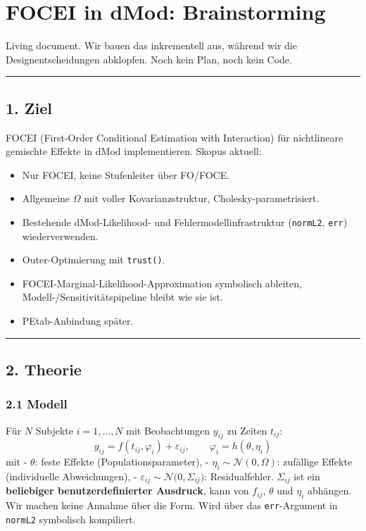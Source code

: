 \documentclass[
]{article}
\author{}
\date{\vspace{-2.5em}}
\providecommand{\tightlist}{%
  \setlength{\itemsep}{0pt}\setlength{\parskip}{0pt}}
\begin{document}
\section{FOCEI in dMod:
Brainstorming}\label{focei-in-dmod-brainstorming}

Living document. Wir bauen das inkrementell aus, während wir die
Designentscheidungen abklopfen. Noch kein Plan, noch kein Code.

\begin{center}\rule{0.5\linewidth}{0.5pt}\end{center}

\subsection{1. Ziel}\label{ziel}

FOCEI (First-Order Conditional Estimation with Interaction) für
nichtlineare gemischte Effekte in dMod implementieren. Skopus aktuell:

\begin{itemize}
\tightlist
\item
  Nur FOCEI, keine Stufenleiter über FO/FOCE.
\item
  Allgemeine \(\Omega\) mit voller Kovarianzstruktur,
  Cholesky-parametrisiert.
\item
  Bestehende dMod-Likelihood- und Fehlermodellinfrastruktur
  (\texttt{normL2}, \texttt{err}) wiederverwenden.
\item
  Outer-Optimierung mit \texttt{trust()}.
\item
  FOCEI-Marginal-Likelihood-Approximation symbolisch ableiten,
  Modell-/Sensitivitätspipeline bleibt wie sie ist.
\item
  PEtab-Anbindung später.
\end{itemize}

\begin{center}\rule{0.5\linewidth}{0.5pt}\end{center}

\subsection{2. Theorie}\label{theorie}

\subsubsection{2.1 Modell}\label{modell}

Für \(N\) Subjekte \(i = 1, \dots, N\) mit Beobachtungen \(y_{ij}\) zu
Zeiten \(t_{ij}\): \[
y_{ij} = f(t_{ij}, \varphi_i) + \varepsilon_{ij}, \qquad \varphi_i = h(\theta, \eta_i)
\] mit - \(\theta\): feste Effekte (Populationsparameter), -
\(\eta_i \sim \mathcal{N}(0, \Omega)\): zufällige Effekte (individuelle
Abweichungen), -
\(\varepsilon_{ij} \sim \mathcal{N}\!\bigl(0, \Sigma_{ij}\bigr)\):
Residualfehler. \(\Sigma_{ij}\) ist ein \textbf{beliebiger
benutzerdefinierter Ausdruck}, kann von \(f_{ij}\), \(\theta\) und
\(\eta_i\) abhängen. Wir machen keine Annahme über die Form. Wird über
das \texttt{err}-Argument in \texttt{normL2} symbolisch kompiliert.
\end{document}

